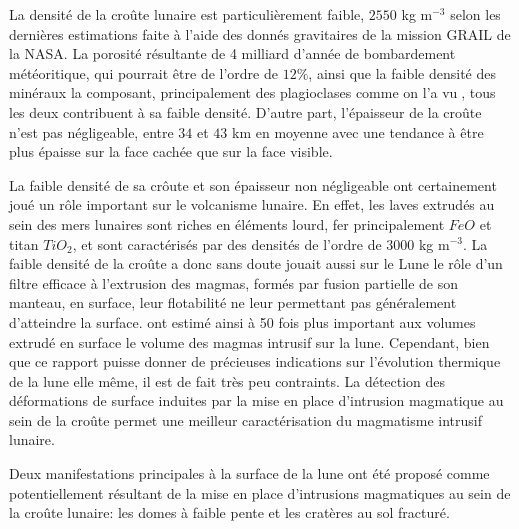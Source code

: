 La densité de la croûte lunaire est particulièrement faible, $2550$ kg
m$^{-3}$ selon  les dernières  estimations faite  à l'aide  des donnés
gravitaires de  la mission GRAIL de  la NASA\citep{Wieczorek:2013ipa}.
La  porosité   résultante  de  4  milliard   d'année  de  bombardement
météoritique, qui  pourrait être  de l'ordre de  $12\%$, ainsi  que la
faible  densité   des  minéraux   la  composant,   principalement  des
plagioclases comme on l'a vu, tous  les deux contribuent à sa faible
densité. D'autre part, l'épaisseur de la croûte n'est pas négligeable,
entre $34$ et $43$ km en moyenne avec une tendance à être plus épaisse
sur la face cachée que sur la face visible.

La faible  densité de sa crôute  et son épaisseur non  négligeable ont
certainement joué  un rôle  important sur  le volcanisme  lunaire.  En
effet, les  laves extrudés au  sein des  mers lunaires sont  riches en
éléments lourd,  fer principalement  $FeO$ et  titan $TiO_2$,  et sont
caractérisés par  des densités  de l'ordre de  $3000$ kg  m$^{-3}$. La
faible densité de la croûte a donc sans doute jouait aussi sur le Lune
le  rôle d'un  filtre efficace  à l'extrusion  des magmas,  formés par
fusion partielle de son manteau,  en surface, leur flotabilité ne leur
permettant        pas        généralement        d'atteindre        la
surface. \citet{Head:1992bk} ont estimé ainsi à 50 fois plus important
aux volumes  extrudé en surface le  volume des magmas intrusif  sur la
lune.   Cependant, bien  que ce  rapport puisse  donner de  précieuses
indications sur l'évolution thermique de la  lune elle même, il est de
fait très  peu contraints.  La  détection des déformations  de surface
induites par  la mise en  place d'intrusion  magmatique au sein  de la
croûte  permet une  meilleur  caractérisation  du magmatisme  intrusif
lunaire.

Deux  manifestations principales  à  la  surface de  la  lune ont  été
proposé  comme   potentiellement  résultant   de  la  mise   en  place
d'intrusions magmatiques  au sein  de la croûte  lunaire: les  domes à
faible pente et les cratères au sol fracturé.

